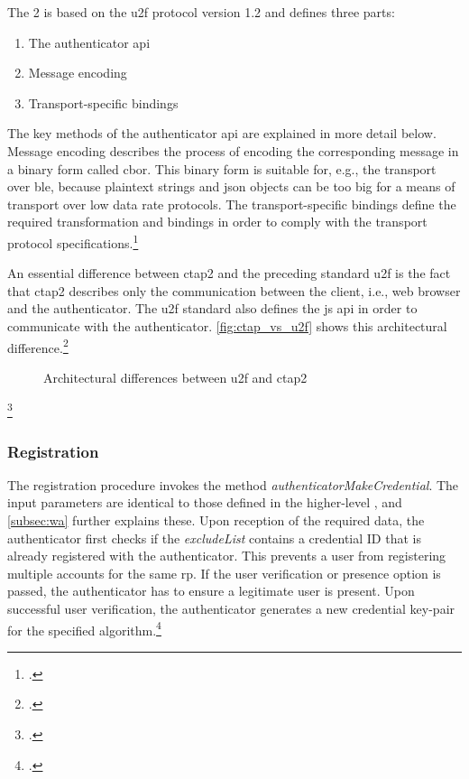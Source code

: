 The  2 is based on the \gls{u2f} protocol version 1.2 and defines three parts:

\begin{enumerate}
	\item The authenticator \gls{api}
	\item Message encoding
	\item Transport-specific bindings
\end{enumerate}

The key methods of the authenticator \gls{api} are explained in more detail below. Message encoding describes the process of encoding the corresponding message in a binary form called \gls{cbor}. This binary form is suitable for, e.g., the transport over \gls{ble}, because plaintext strings and \gls{json} objects can be too big for a means of transport over low data rate protocols. The transport-specific bindings define the required transformation and bindings in order to comply with the transport protocol specifications.\footcites[See][4--5]{ctap2}

An essential difference between \gls{ctap}2 and the preceding standard \gls{u2f} is the fact that \gls{ctap}2 describes only the communication between the client, i.e., web browser and the authenticator. The \gls{u2f} standard also defines the \gls{js} \gls{api} in order to communicate with the authenticator. \autoref{fig:ctap_vs_u2f} shows this architectural difference.\footcites[See][51]{kim-new-way-fido}[See][254]{Schwartz2018}

\begin{figure}[hbt]
	\centering
	
	\caption[Architectural differences between \gls{u2f} and \gls{ctap}2]{Architectural differences between \gls{u2f} and \gls{ctap}2\footnotemark}
	\label{fig:ctap_vs_u2f}
\end{figure}
\footcitetexts[Source: diagram by author, based on][4]{u2f-overview}[][Chapter 6]{w3c}

\newpage

\subsubsection{Registration}

The registration procedure invokes the method \textit{authenticatorMakeCredential}. The input parameters are identical to those defined in the higher-level \wa, and \autoref{subsec:wa} further explains these. Upon reception of the required data, the authenticator first checks if the \textit{excludeList} contains a credential ID that is already registered with the authenticator. This prevents a user from registering multiple accounts for the same \gls{rp}. If the user verification or presence option is passed, the authenticator has to ensure a legitimate user is present. Upon successful user verification, the authenticator generates a new credential key-pair for the specified algorithm.\footcites[See][9]{ctap2}

